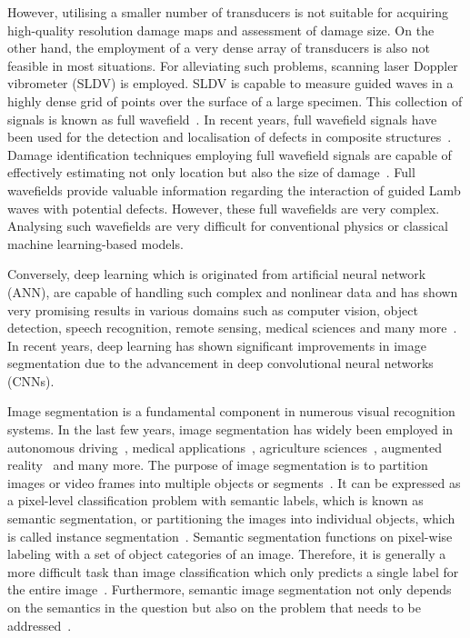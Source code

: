 However, utilising a smaller number of transducers is not suitable for acquiring high-quality resolution damage maps and assessment of damage size.
On the other hand, the employment of a very dense array of transducers is also not feasible in most situations. 
For alleviating such problems, scanning laser Doppler vibrometer (SLDV) is employed. 
SLDV is capable to measure guided waves in a highly dense grid of points over the surface of a large specimen.
This collection of signals is known as full wavefield~\cite{Radzienski2019a}. 
In recent years, full wavefield signals have been used for the detection and localisation of defects in composite
structures~\cite{Radzienski2019a, Girolamo2018a, kudela2018impact,  rogge2013characterization}.
Damage identification techniques employing full wavefield signals are capable of effectively estimating not only location but also the size of damage~\cite{Girolamo2018a, kudela2018impact}.
Full wavefields provide valuable information regarding the interaction of guided Lamb waves with potential defects.  
However, these full wavefields are very complex. 
Analysing such wavefields are very difficult for conventional physics or classical machine learning-based models. 
 
Conversely, deep learning which is originated from artificial neural network (ANN), are capable of handling such complex and nonlinear data and has shown very promising results in various domains such as computer vision, object detection, speech recognition, remote sensing, medical sciences
and many more~\cite{mohanty2016using, zhang2020well, pashaei2020review}.
In recent years, deep learning has shown significant improvements in image segmentation due to the advancement in deep convolutional neural networks (CNNs).

Image segmentation is a fundamental component in numerous visual recognition
systems. In the last few years, image segmentation has widely been
employed in autonomous driving~\cite{ros2016synthia, li2018real}, medical applications~\cite{taghanaki2021deep}, agriculture sciences~\cite{milioto2018real}, augmented reality~\cite{miksik2015semantic} and many more. 
The purpose of image segmentation is to partition images or video frames into multiple objects or segments~\cite{szeliski2010computer}.
It can be expressed as a pixel-level classification problem with semantic labels, which is known as semantic segmentation, or partitioning the images into individual objects, which is called instance segmentation~\cite{szeliski2010computer, minaee2021image}. 
Semantic segmentation functions on pixel-wise labeling with a set of object categories of an image. 
Therefore, it is generally a more difficult task than image classification which only predicts a single label for the entire image~\cite{minaee2021image}.
Furthermore, semantic image segmentation not only depends on the semantics in
the question but also on the problem that needs to be addressed~\cite{ghosh2019understanding}.

